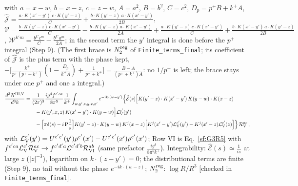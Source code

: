 with $a=x-w$, $b=x-z$, $c=z-w$, $A=a^{2}$, $B=b^{2}$, $C=c^{2}$, $D_{p}=p^{+}B+k^{+}A$, $\widehat{\mathcal{J}}=\frac{a\cdot K(x'-y')\;c\cdot K(y'-z)}{C}+\frac{b\cdot K(y'-z)\;a\cdot K(x'-y')}{2B}$, $\mathcal{V}=\frac{b\cdot K(y'-z)\,c\cdot K(x'-y')}{C}-\frac{b\cdot K(y'-z)\,a\cdot K(x'-y')}{2A}+\frac{a\cdot K(y'-z)\,c\cdot K(x'-y')}{C}+\frac{b\cdot K(x'-y')\,a\cdot K(y'-z)}{2B}$, $\mathcal{W}^{k'm}=\frac{b^{k'}c^{m}}{C}-\frac{b^{k'}a^{m}}{2A}$; in the second term the $y'$ integral is done before the $p^{+}$ integral (Step 9). (The first brace is $N_{2}^{\rm reg}$ of \texttt{Finite\_terms\_final}; its coefficient of $\widehat{\mathcal{J}}$ is the plus term with the phase kept, $-\big[\frac{k^{+}}{p^{+}(p^{+}+k^{+})}(1-\frac{D_{p}}{k^{+}A})+\frac{1}{p^{+}+k^{+}}\big]=\frac{B-A}{(p^{+}+k^{+})A}$: no $1/p^{+}$ is left; the brace stays under one $p^{+}$ and one $z$ integral.)
\begin{align}
\frac{d^{3}N^{\rm III,V}}{d^{3}k}&=\frac{1}{(2\pi)^{3}}\frac{ig^{4}f^{c'ca}}{8\pi^{5}}\frac{1}{k^{+}}\int_{w,y',z,y,x,x'}e^{-ik\cdot(w-y')}\Big\{\widehat{\mathcal{E}}(s)\Big[K(y'-z)\cdot K(x'-y')\,K(y-w)\cdot K(x-z)\notag\\&\qquad-K(y',x,z)\,K(x'-y')\cdot K(y-w)\Big]\mathcal{L}_{\rm V}^{c'}(y')\notag\\
&\qquad-\Big[\pi\delta(s)-i\,{\rm P}\frac1s\Big]K(y'-z)\cdot K(y-w)\,K^{j}(x-z)\Big[K^{j}(x'-y')\mathcal{L}_{\rm V}^{c'}(y')-K^{j}(x'-z)\mathcal{L}_{\rm V}^{c'}(z)\Big]\Big\}\,\mathcal{R}_{\rm V}^{ac}\,,\label{sf:G3R5}
\end{align}
with $\mathcal{L}_{\rm V}^{c'}(y')=U^{c'e'}(y')\rho^{e'}(x')-U^{c'e'}(x')\rho^{e'}(x')$; Row VI is Eq.~\eqref{sf:G3R5} with $f^{c'ca}\mathcal{L}_{\rm V}^{c'}\mathcal{R}^{ac}_{\rm V}\to f^{c'd'a}\mathcal{L}^{c'd'b}\mathcal{R}^{ab}_{\rm VI}$ (same prefactor $\frac{ig^{4}}{8\pi^{5}k^{+}}$). Integrability: $\widehat{\mathcal{E}}(s)\simeq\frac{1}{is}$ at large $z$ ($|z|^{-3}$), logarithm on $k\cdot(z-y')=0$; the distributional terms are finite (Step 9), no tail without the phase $e^{-ik\cdot(w-z)}$; $N_{2}^{\rm reg}$: $\log R/R^{3}$ [checked in \texttt{Finite\_terms\_final}].


